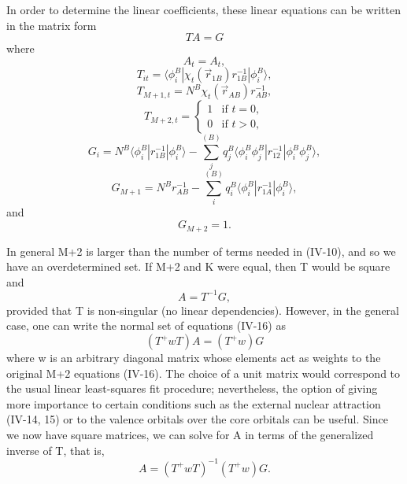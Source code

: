 \documentclass[12pt,letterpaper]{report}
\begin{document}
In order to determine the linear coefficients, these linear equations can be written in the matrix form
\begin{equation}
TA = G
\end{equation}
where
\begin{equation}
A_t = A_t,
\end{equation}
\begin{equation}
T_{it} = \langle \phi_i^B | \chi_t(\vec{r}_{1B})r_{1B}^{-1} | \phi_i^B \rangle,
\end{equation}
\begin{equation}
T_{M+1,t} = N^B \chi_t(\vec{r}_{AB}) r_{AB}^{-1},
\end{equation}
\begin{equation}
T_{M+2,t} = \begin{cases}
1 & \text{if } t = 0,\\
0 & \text{if } t > 0,
\end{cases}
\end{equation}
\begin{equation}
G_i = N^B \langle \phi_i^B | r_{1B}^{-1} | \phi_i^B \rangle - \sum_j^{(B)} q_j^B \langle \phi_i^B \phi_j^B | r_{12}^{-1} | \phi_i^B \phi_j^B \rangle,
\end{equation}
\begin{equation}
G_{M+1} = N^B r_{AB}^{-1} - \sum_i^{(B)} q_i^B \langle \phi_i^B | r_{1A}^{-1} | \phi_i^B \rangle,
\end{equation}
and
\begin{equation}
G_{M+2} = 1.
\end{equation}

In general M+2 is larger than the number of terms needed in (IV-10), and so we have an overdetermined set. If M+2 and K were equal, then T would be square and
\begin{equation}
A = T^{-1} G,
\end{equation}
provided that T is non-singular (no linear dependencies). However, in the general case, one can write the normal set of equations (IV-16) as
\begin{equation}
(T^+ wT) A = (T^+ w)G
\end{equation}
where w is an arbitrary diagonal matrix whose elements act as weights to the original M+2 equations (IV-16). The choice of a unit matrix would correspond to the usual linear least-squares fit procedure; nevertheless, the option of giving more importance to certain conditions such as the external nuclear attraction (IV-14, 15) or to the valence orbitals over the core orbitals can be useful. Since we now have square matrices, we can solve for A in terms of the generalized inverse of T, that is,
\begin{equation}
A = (T^+ wT)^{-1}(T^+ w) G.
\end{equation}
\end{document}
